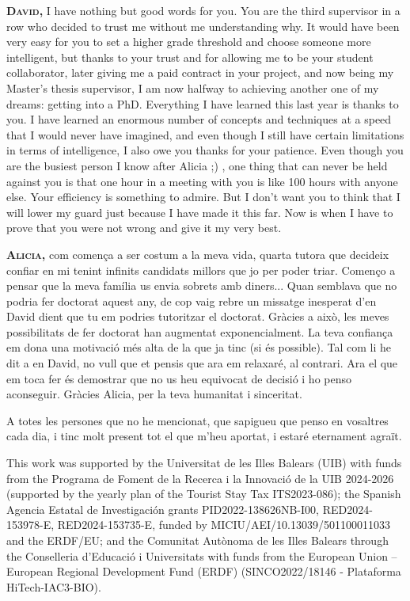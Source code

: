 \textsc{\textbf{David,}} I have nothing but good words for you. You are the third supervisor in a row who decided to trust me without me understanding why. It would have been very easy for you to set a higher grade threshold and choose someone more intelligent, but thanks to your trust and for allowing me to be your student collaborator, later giving me a paid contract in your project, and now being my Master's thesis supervisor, I am now halfway to achieving another one of my dreams: getting into a PhD. Everything I have learned this last year is thanks to you. I have learned an enormous number of concepts and techniques at a speed that I would never have imagined, and even though I still have certain limitations in terms of intelligence, I also owe you thanks for your patience. Even though you are the busiest person I know after Alicia ;) , one thing that can never be held against you is that one hour in a meeting with you is like 100 hours with anyone else. Your efficiency is something to admire. But I don't want you to think that I will lower my guard just because I have made it this far. Now is when I have to prove that you were not wrong and give it my very best.


\textsc{\textbf{Alicia,}} com comença a ser costum a la meva vida, quarta tutora que decideix confiar en mi tenint infinits candidats millors que jo per poder triar. Començo a pensar que la meva família us envia sobrets amb diners... Quan semblava que no podria fer doctorat aquest any, de cop vaig rebre un missatge inesperat d'en David dient que tu em podries tutoritzar el doctorat. Gràcies a això, les meves possibilitats de fer doctorat han augmentat exponencialment. La teva confiança em dona una motivació més alta de la que ja tinc (si és possible). Tal com li he dit a en David, no vull que et pensis que ara em relaxaré, al contrari. Ara el que em toca fer és demostrar que no us heu equivocat de decisió i ho penso aconseguir. Gràcies Alicia, per la teva humanitat i sinceritat.


A totes les persones que no he mencionat, que sapigueu que penso en vosaltres cada dia, i tinc molt present tot el que m'heu aportat, i estaré eternament agraït.



This work was supported by the Universitat de les Illes Balears (UIB) with funds from the Programa de Foment de la Recerca i la Innovaci\'o de la UIB 2024-2026 (supported by the yearly plan of the Tourist Stay Tax ITS2023-086); the Spanish Agencia Estatal de Investigaci\'on grants PID2022-138626NB-I00, RED2024-153978-E, RED2024-153735-E, funded by MICIU/AEI/10.13039/501100011033 and the ERDF/EU; and the Comunitat Aut\`onoma de les Illes Balears through the Conselleria d'Educaci\'o i Universitats with funds from the European Union -- European Regional Development Fund (ERDF) (SINCO2022/18146 - Plataforma HiTech-IAC3-BIO). 

